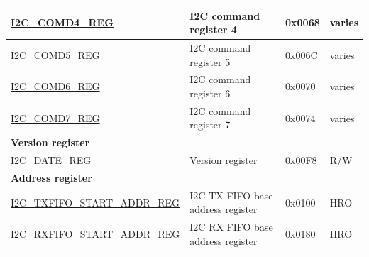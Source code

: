 \begin{longtable}{ | p{6cm} | p{7cm} | p{1.3cm} | p{1cm} | }
    \hyperref[regdesc:I2CCOMD4REG]{I2C\_COMD4\_REG} & I2C command register 4 & 0x0068 & varies \\ \hline
    \hyperref[regdesc:I2CCOMD5REG]{I2C\_COMD5\_REG} & I2C command register 5 & 0x006C & varies \\ \hline
    \hyperref[regdesc:I2CCOMD6REG]{I2C\_COMD6\_REG} & I2C command register 6 & 0x0070 & varies \\ \hline
    \hyperref[regdesc:I2CCOMD7REG]{I2C\_COMD7\_REG} & I2C command register 7 & 0x0074 & varies \\ \hline
    \multicolumn{4}{|l|}{\textbf{Version register}} \\ \hline
    \hyperref[regdesc:I2CDATEREG]{I2C\_DATE\_REG} & Version register & 0x00F8 & R/W \\ \hline
    \multicolumn{4}{|l|}{\textbf{Address register}} \\ \hline
    \hyperref[regdesc:I2CTXFIFOSTARTADDRREG]{I2C\_TXFIFO\_START\_ADDR\_REG} & I2C TX FIFO base address register & 0x0100 & HRO \\ \hline
    \hyperref[regdesc:I2CRXFIFOSTARTADDRREG]{I2C\_RXFIFO\_START\_ADDR\_REG} & I2C RX FIFO base address register & 0x0180 & HRO \\ \hline
    \end{longtable}
